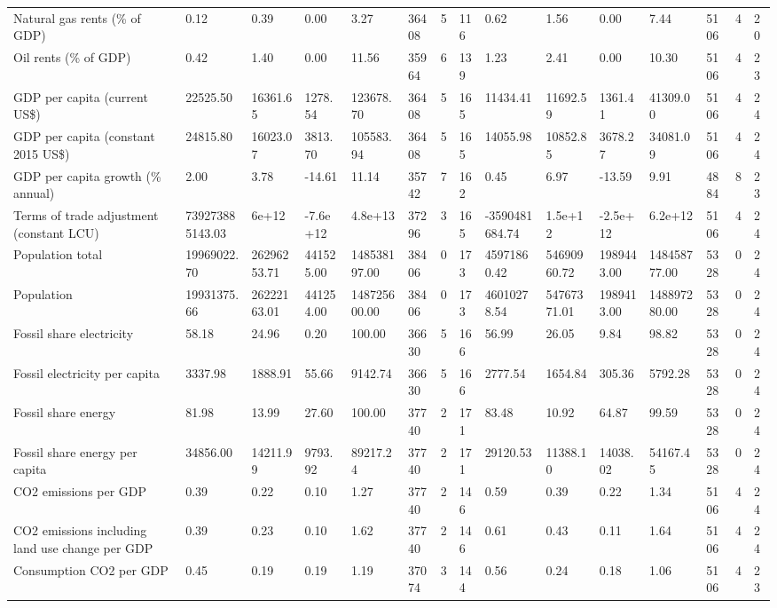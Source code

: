 \begin{longtable}{lllllllllllllll}
\addlinespace
Natural gas rents (\% of GDP) & 0.12 & 0.39 & 0.00 & 3.27 & 36408 & 5 & 116 & 0.62 & 1.56 & 0.00 & 7.44 & 5106 & 4 & 20\\
Oil rents (\% of GDP) & 0.42 & 1.40 & 0.00 & 11.56 & 35964 & 6 & 139 & 1.23 & 2.41 & 0.00 & 10.30 & 5106 & 4 & 23\\
GDP per capita (current US\$) & 22525.50 & 16361.65 & 1278.54 & 123678.70 & 36408 & 5 & 165 & 11434.41 & 11692.59 & 1361.41 & 41309.00 & 5106 & 4 & 24\\
GDP per capita (constant 2015 US\$) & 24815.80 & 16023.07 & 3813.70 & 105583.94 & 36408 & 5 & 165 & 14055.98 & 10852.85 & 3678.27 & 34081.09 & 5106 & 4 & 24\\
GDP per capita growth (\% annual) & 2.00 & 3.78 & -14.61 & 11.14 & 35742 & 7 & 162 & 0.45 & 6.97 & -13.59 & 9.91 & 4884 & 8 & 23\\
\addlinespace
Terms of trade adjustment (constant LCU) & 739273885143.03 & 6e+12 & -7.6e+12 & 4.8e+13 & 37296 & 3 & 165 & -3590481684.74 & 1.5e+12 & -2.5e+12 & 6.2e+12 & 5106 & 4 & 24\\
Population total & 19969022.70 & 26296253.71 & 441525.00 & 148538197.00 & 38406 & 0 & 173 & 45971860.42 & 54690960.72 & 1989443.00 & 148458777.00 & 5328 & 0 & 24\\
Population & 19931375.66 & 26222163.01 & 441254.00 & 148725600.00 & 38406 & 0 & 173 & 46010278.54 & 54767371.01 & 1989413.00 & 148897280.00 & 5328 & 0 & 24\\
Fossil share electricity & 58.18 & 24.96 & 0.20 & 100.00 & 36630 & 5 & 166 & 56.99 & 26.05 & 9.84 & 98.82 & 5328 & 0 & 24\\
Fossil electricity per capita & 3337.98 & 1888.91 & 55.66 & 9142.74 & 36630 & 5 & 166 & 2777.54 & 1654.84 & 305.36 & 5792.28 & 5328 & 0 & 24\\
\addlinespace
Fossil share energy & 81.98 & 13.99 & 27.60 & 100.00 & 37740 & 2 & 171 & 83.48 & 10.92 & 64.87 & 99.59 & 5328 & 0 & 24\\
Fossil share energy per capita & 34856.00 & 14211.99 & 9793.92 & 89217.24 & 37740 & 2 & 171 & 29120.53 & 11388.10 & 14038.02 & 54167.45 & 5328 & 0 & 24\\
CO2 emissions per GDP & 0.39 & 0.22 & 0.10 & 1.27 & 37740 & 2 & 146 & 0.59 & 0.39 & 0.22 & 1.34 & 5106 & 4 & 24\\
CO2 emissions including land use change per GDP & 0.39 & 0.23 & 0.10 & 1.62 & 37740 & 2 & 146 & 0.61 & 0.43 & 0.11 & 1.64 & 5106 & 4 & 24\\
Consumption CO2 per GDP & 0.45 & 0.19 & 0.19 & 1.19 & 37074 & 3 & 144 & 0.56 & 0.24 & 0.18 & 1.06 & 5106 & 4 & 23\\

\end{longtable}
